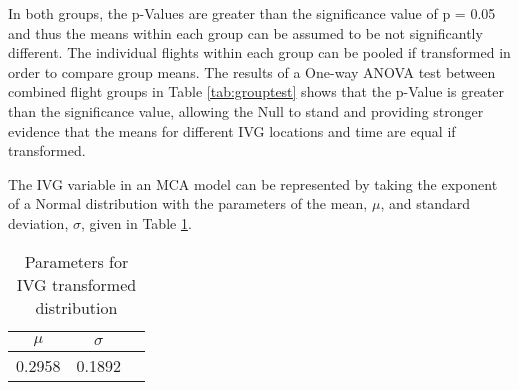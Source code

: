 In both groups, the p-Values are greater than the significance value of p = 0.05 and thus the means within each group can be assumed to be not significantly different. The individual flights within each group can be pooled if transformed in order to compare group means. The results of a One-way ANOVA test between combined flight groups in Table \ref{tab:grouptest} shows that the p-Value is greater than the significance value, allowing the Null to stand and providing stronger evidence that the means for different IVG locations and time are equal if transformed.
%
\begin{table}[!htb]
\centering
\caption{Statistics and One-way ANOVA test for transformed groups.}
\label{tab:grouptest}
\end{table}

The IVG variable in an MCA model can be represented by taking the exponent of a Normal distribution with the parameters of the mean, $\mu$, and standard deviation, $\sigma$, given in Table \ref{tab:gapnormal}.

\begin{table}[!htb]
\centering
\caption{Parameters for IVG transformed distribution}
\label{tab:gapnormal}
\begin{tabular}{@{}ccc@{}}
\toprule
 \textbf{$\mu$} & \textbf{$\sigma$} \\ \midrule
 0.2958 & 0.1892 \\ \bottomrule
\end{tabular}
\end{table}


